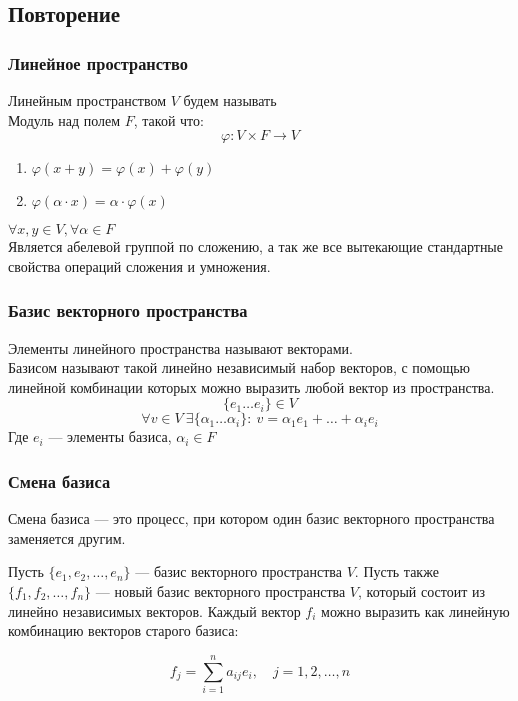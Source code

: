 \subsection{Повторение}
\subsubsection{Линейное пространство}
Линейным пространством $V$ будем называть\\
Модуль над полем $F$, такой что:
\[
\varphi : V \times F \to V
\]
\begin{enumerate}
    \item \( \varphi(x+y) = \varphi(x) + \varphi(y) \)
    \item \( \varphi(\alpha \cdot x) = \alpha \cdot \varphi(x) \)
\end{enumerate}
\( \forall x,y \in V, \forall \alpha \in F \)\\
Является абелевой группой по сложению, а так же все вытекающие
стандартные свойства операций сложения и умножения.

\subsubsection*{Базис векторного пространства}
Элементы линейного пространства называют векторами.\\
Базисом называют такой линейно независимый набор векторов, 
с помощью линейной комбинации которых можно выразить любой вектор
из пространства.\\
\[
    \{e_1 \dots e_i\} \in V 
\]
\[
    \forall v \in V\  \exists \{\alpha_1 \dots \alpha_i\}: \ v = \alpha_1 e_1 + \dots + \alpha_i e_i
\]
Где $e_i$ --- элементы базиса, $\alpha_i \in F$

\subsubsection*{Смена базиса}

Смена базиса — это процесс, при котором один базис векторного пространства заменяется другим.

Пусть $\{e_1, e_2, \ldots, e_n\}$ — базис векторного пространства $V$. Пусть также $\{f_1, f_2, \ldots, f_n\}$ — новый базис векторного пространства $V$, который состоит из линейно независимых векторов. Каждый вектор $f_i$ можно выразить как линейную комбинацию векторов старого базиса:

\[
f_j = \sum_{i=1}^{n} a_{ij} e_i, \quad j = 1, 2, \ldots, n
\]

